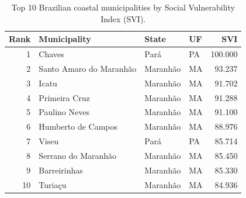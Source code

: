 \begin{table}[htbp]
\caption{Top 10 Brazilian coastal municipalities by Social Vulnerability Index (SVI).}
\label{tab:top10-municipal-svi}
\begin{tabular}{rlllr}
\toprule
Rank & Municipality & State & UF & SVI \\
\midrule
1 & Chaves & Pará & PA & 100.000 \\
2 & Santo Amaro do Maranhão & Maranhão & MA & 93.237 \\
3 & Icatu & Maranhão & MA & 91.702 \\
4 & Primeira Cruz & Maranhão & MA & 91.288 \\
5 & Paulino Neves & Maranhão & MA & 91.100 \\
6 & Humberto de Campos & Maranhão & MA & 88.976 \\
7 & Viseu & Pará & PA & 85.714 \\
8 & Serrano do Maranhão & Maranhão & MA & 85.450 \\
9 & Barreirinhas & Maranhão & MA & 85.330 \\
10 & Turiaçu & Maranhão & MA & 84.936 \\
\bottomrule
\end{tabular}
\end{table}
